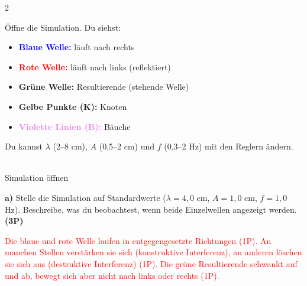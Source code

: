 \documentclass[11pt,a4paper]{article}
\begin{document}
\begin{multicols}{2}
\setlength{\columnseprule}{0.4pt}

\begin{tcolorbox}[colback=blue!5,colframe=blue!40!black,coltitle=black,colbacktitle=blue!10,
    title=\textbf{Simulation: Stehende Wellen}]
\small
Öffne die Simulation. Du siehst:
\begin{itemize}[leftmargin=*]
\item \textcolor{blue}{\textbf{Blaue Welle:}} läuft nach rechts
\item \textcolor{red}{\textbf{Rote Welle:}} läuft nach links (reflektiert)
\item \textcolor{green!50!black}{\textbf{Grüne Welle:}} Resultierende (stehende Welle)
\item \textcolor{yellow!80!black}{\textbf{Gelbe Punkte (K):}} Knoten
\item \textcolor{violet}{\textbf{Violette Linien (B):}} Bäuche
\end{itemize}

Du kannst $\lambda$ (2--8 cm), $A$ (0,5--2 cm) und $f$ (0,3--2 Hz) mit den Reglern ändern.

\vspace{0.2cm}
\begin{center}
\\[0.2cm]
\tiny Simulation öffnen
\end{center}
\end{tcolorbox}

\vspace{0.3cm}

\begin{tcolorbox}[colback=white,colframe=black,coltitle=black,colbacktitle=white,
    title=\textbf{1: Beobachtung der Superposition}]

\textbf{a)} Stelle die Simulation auf Standardwerte ($\lambda = 4{,}0$ cm, $A = 1{,}0$ cm, $f = 1{,}0$ Hz). Beschreibe, was du beobachtest, wenn beide Einzelwellen angezeigt werden. \textbf{(3P)}

\textcolor{red}{Die blaue und rote Welle laufen in entgegengesetzte Richtungen {\color{blue}(1P)}. An manchen Stellen verstärken sie sich (konstruktive Interferenz), an anderen löschen sie sich aus (destruktive Interferenz) {\color{blue}(1P)}. Die grüne Resultierende schwankt auf und ab, bewegt sich aber nicht nach links oder rechts {\color{blue}(1P)}.}


\end{tcolorbox}
\end{multicols}
\end{document}
